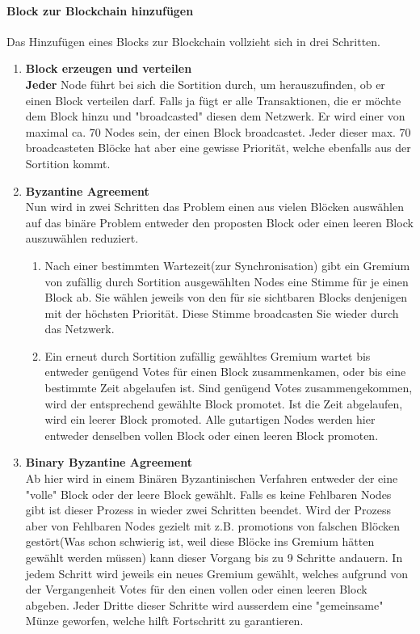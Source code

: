 \documentclass[11pt,a4paper]{article}
\begin{document}
\paragraph*{Block zur Blockchain hinzuf\"ugen }
Das Hinzuf\"ugen eines Blocks zur Blockchain vollzieht sich in drei Schritten.
\begin{enumerate}[label=\arabic*)]
	\item \textbf{Block erzeugen und verteilen}\\
	\textbf{Jeder} Node f\"uhrt bei sich die Sortition durch, um herauszufinden, ob er einen Block verteilen darf. Falls ja f\"ugt er alle Transaktionen, die er m\"ochte dem Block hinzu und "broadcasted" diesen dem Netzwerk. Er wird einer von maximal ca. 70 Nodes sein, der einen Block broadcastet. Jeder dieser max. 70 broadcasteten Bl\"ocke hat aber eine gewisse Priorit\"at, welche ebenfalls aus der Sortition kommt.
	 
	\item \textbf{Byzantine Agreement}\\
	Nun wird in zwei Schritten das Problem \grqq{}einen aus vielen Bl\"ocken ausw\"ahlen\grqq{} auf das bin\"are Problem \grqq{}entweder den proposten Block oder einen leeren Block auszuw\"ahlen\grqq{} reduziert.
	\begin{enumerate}[label=\Roman*)]
		\item Nach einer bestimmten Wartezeit(zur Synchronisation) gibt ein Gremium von zuf\"allig durch Sortition ausgew\"ahlten Nodes eine Stimme für je einen Block ab. Sie w\"ahlen jeweils von den für sie sichtbaren Blocks denjenigen mit der h\"ochsten Priorit\"at. Diese Stimme broadcasten Sie wieder durch das Netzwerk.
		
		\item Ein erneut durch Sortition zuf\"allig gew\"ahltes Gremium wartet bis entweder gen\"ugend Votes für einen Block zusammenkamen, oder bis eine bestimmte Zeit abgelaufen ist. 
		Sind gen\"ugend Votes zusammengekommen, wird der entsprechend gew\"ahlte Block promotet.
		Ist die Zeit abgelaufen, wird ein leerer Block promoted. 
		Alle gutartigen Nodes werden hier entweder denselben vollen Block oder einen leeren Block promoten. 
	\end{enumerate}
	\item \textbf{Binary Byzantine Agreement}\\
	Ab hier wird in einem Bin\"aren Byzantinischen Verfahren entweder der eine "volle" Block oder der leere Block gew\"ahlt. Falls es keine Fehlbaren Nodes gibt ist dieser Prozess in wieder zwei Schritten beendet. Wird der Prozess aber von Fehlbaren Nodes gezielt mit z.B. promotions von falschen Blöcken gest\"ort(Was schon schwierig ist, weil diese Bl\"ocke ins Gremium h\"atten gew\"ahlt werden m\"ussen) kann dieser Vorgang bis zu 9 Schritte andauern.
	In jedem Schritt wird jeweils ein neues Gremium gew\"ahlt, welches aufgrund von der Vergangenheit Votes für den einen vollen oder einen leeren Block abgeben. Jeder Dritte dieser Schritte wird ausserdem eine "gemeinsame" Münze geworfen, welche hilft Fortschritt zu garantieren. 
\end{enumerate}
\end{document}

